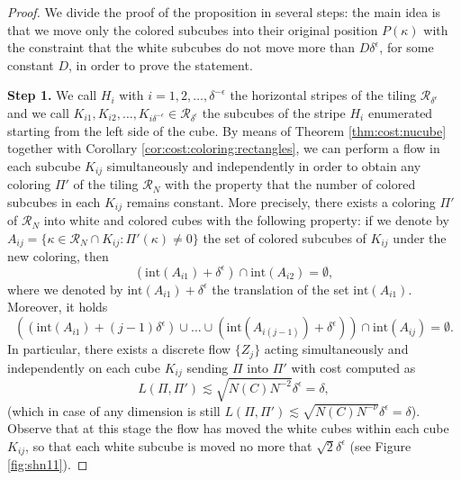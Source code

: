 \documentclass[12 pt]{article}
\theoremstyle{definition} \newtheorem{definition}{Definition}[section]
\theoremstyle{definition} \newtheorem{remark}[definition]{Remark}
\theoremstyle{plain} \newtheorem{lemma}[definition]{Lemma}
\theoremstyle{plain} \newtheorem{proposition}[definition]{Proposition}
\theoremstyle{plain} \newtheorem{theorem}[definition]{Theorem}
\theoremstyle{plain} \newtheorem{corollary}[definition]{Corollary}
\theoremstyle{definition} \newtheorem{example}[definition]{Example}
\theoremstyle{definition} \newtheorem{assumption}[definition]{Assumption}
\theoremstyle{definition} \newtheorem{conjecture}[definition]{Conjecture}
\newcommand{\1}{\mathbbm 1}
\numberwithin{equation}{section}
\begin{document}
\begin{proof}
\medskip

We divide the proof of the proposition in several steps: the main idea is that we move only the colored subcubes into their original position $P(\kappa)$ with the constraint that the white subcubes do not move more than $D\delta^\epsilon$, for some constant $D$, in order to prove the statement. 

\medskip


\textbf{Step 1.} We call $H_i$ with $i=1,2,\dots, \delta^{-\epsilon}$ the horizontal stripes of the tiling $\mathcal{R}_{\delta^\epsilon}$ and we call $K_{i1},K_{i2},\dots, K_{i\delta^{-\epsilon}}\in\mathcal{R}_{\delta^\epsilon}$ the subcubes  of the stripe $H_i$ enumerated starting from the left side of the cube. By means of Theorem \ref{thm:cost:nucube} together with Corollary \ref{cor:cost:coloring:rectangles}, we can perform a flow in each subcube $K_{ij}$ simultaneously and independently in order to obtain any coloring $\Pi'$ of the tiling $\mathcal{R}_N$ with the property that the number of colored subcubes in each $K_{ij}$ remains constant. More precisely, there exists a coloring $\Pi'$ of $\mathcal{R}_N$ into white and colored cubes with the following property: if we denote by $A_{ij}=\lbrace \kappa\in\mathcal{R}_N\cap K_{ij}:\Pi'(\kappa)\not=0\rbrace$ the set of colored subcubes of $K_{ij}$ under the new coloring, then
\begin{equation*}
    \left(\text{int}(A_{i1})+\delta^\epsilon\right)\cap \text{int}(A_{i2})=\emptyset,
\end{equation*}
where we denoted by $\text{int}(A_{i1})+\delta^\epsilon$ the translation of the set $\text{int}(A_{i1})$. Moreover, it holds
\begin{equation}\label{eq:inter:ins}
    \left(\left(\text{int}(A_{i1})+(j-1)\delta^\epsilon\right)\cup\dots\cup\left(\text{int}(A_{i(j-1)})+\delta^\epsilon\right)\right)\cap \text{int}(A_{ij})=\emptyset.
\end{equation}
In particular, there exists a discrete flow $\lbrace Z_j\rbrace$ acting simultaneously and independently on each cube $K_{ij}$ sending $\Pi$ into $\Pi'$ with cost computed as
\begin{equation*}
    L(\Pi,\Pi')\lesssim\sqrt{N(C)N^{-2}}\delta^\epsilon=\delta,
\end{equation*}
(which in case of any dimension is still $L(\Pi,\Pi')\lesssim\sqrt{N(C)N^{-\nu}}\delta^\epsilon=\delta$). Observe that at this stage the flow has moved the white cubes within each cube $K_{ij}$, so that each white subcube is moved no more that $\sqrt{2}\delta^\epsilon$ (see Figure \ref{fig:shn11}).


\end{proof}
\end{document}
